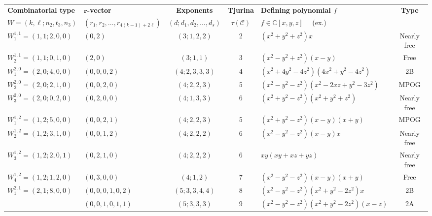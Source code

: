\documentclass[11pt]{article}
\theoremstyle{plain}
\theoremstyle{definition}
\begin{document}
\begin{landscape}

\begin{table}[h!]
 \centering
 \renewcommand{\arraystretch}{1.5}
 \begin{tabular}{@{}llcclc@{}}
 \toprule 
 \textbf{Combinatorial type} & \textbf{$\mathbf{r}$-vector} & \textbf{Exponents} & \textbf{Tjurina} & \textbf{Defining polynomial $f$} & \multirow{2}{*}{\textbf{Type}} \\ $W=(k,\ell;n_2,t_3,n_3)$ & $(r_1,r_2,\ldots,r_{4(k-1)+2\ell})$ & $(d;d_1,d_2,\ldots,d_s)$ & $\tau{(\mathcal{C})}$& $f\in\mathbb{C}[x,y,z]$ \, \, (ex.) &  \\
 \midrule
 \midrule
 $W^{1,1}_1=(1,1;2,0,0)$ & $(0,2)$ & $(3; 1,2,2)$ & 2 & $(x^2+y^2+z^2)x$ & Nearly free \\

 
 $W_2^{1,1}=(1,1;0,1,0)$ & $(2,0)$ & $(3;1,1)$ & 3 & $(x^2-y^2+z^2)(x-y)$  & Free \\
 
 \midrule
 $W_1^{2,0}=(2,0;4,0,0)$ & $(0,0,0,2)$ & $(4;2,3,3,3)$ & 4 & $(x^2+4y^2-4z^2)(4x^2+y^2-4z^2)$ & 2B \\

 
 $W_2^{2,0}=(2,0;2,1,0)$ & $(0,0,2,0)$ & $(4;2,2,3)$ & 5 & $(x^2-y^2-z^2)(x^2-2xz+y^2-3z^2)$ & MPOG \\

 
 $W_3^{2,0}=(2,0;0,2,0)$ & $(0,2,0,0)$ & $(4;1,3,3)$ & 6 & $(x^2+y^2-z^2)(x^2+y^2+z^2)$ & Nearly free \\
 
 \midrule
 $W_1^{1,2}=(1,2;5,0,0)$ & $(0,0,2,1)$ & $(4; 2,2,3)$ & 5 & $(x^2+y^2-z^2)(x-y)(x+y)$ & MPOG \\
 
 $W_2^{1,2}=(1,2;3,1,0)$ & $(0,0,1,2)$ & $(4;2,2,2)$ & 6 & $(x^2-y^2-z^2)(x-y)x$ & Nearly free \\

 $W_3^{1,2}=(1,2;2,0,1)$ & $(0,2,1,0)$ & $(4; 2,2,2) $ & 6 & $xy(xy+xz+yz)$ & Nearly free \\
 
$W_4^{1,2}=(1,2;1,2,0)$ & $(0,3,0,0)$ & $(4;1,2)$ & 7 & $(x^2-y^2-z^2)(x-y)(x+y)$ & Free \\




\midrule
 $W_1^{2,1}=(2,1;8,0,0)$ & $(0,0,0,1,0,2)$ & $(5; 3,3,4,4)$ & 8 & $(x^2-y^2-z^2)(x^2+y^2-2z^2)x$ & 2B \\
\hdashline

 \multirow{2}{*}{$W_2^{2,1}=(2,1;6,1,0)$} &
$(0,0,1,0,1,1)$  & \multirow{2}{*}{$(5;3,3,3)$} & \multirow{2}{*}{9} & $(x^2-y^2-z^2)(x^2+y^2-2z^2)(x-z)$ & \multirow{2}{*}{2A} \\



\end{tabular}
\end{table}
\end{landscape}
\end{document}
